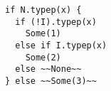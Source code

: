 \begin{lstlisting}[style=reclojureScala]
if N.typep(x) {
  if (!I).typep(x)
    Some(1)
  else if I.typep(x)
    Some(2)
  else ~~None~~
} else ~~Some(3)~~
\end{lstlisting}
